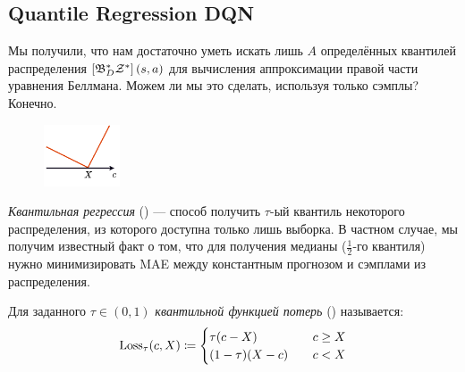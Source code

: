 \subsection{Quantile Regression DQN}\label{subsec:qrdqn}

Мы получили, что нам достаточно уметь искать лишь $A$ определённых квантилей распределения $\left[ \mathfrak{B}^*_D \mathcal{Z}^* \right](s, a)$ для вычисления аппроксимации правой части уравнения Беллмана. Можем ли мы это сделать, используя только сэмплы? Конечно. 

\begin{figure}
\vspace{-0.75cm}
\centering
\includegraphics[width=0.2\textwidth]{Images/quantileloss.png}
\vspace{-1.75cm}
\end{figure}
\emph{Квантильная регрессия} () --- способ получить $\tau$-ый квантиль некоторого распределения, из которого доступна только лишь выборка. В частном случае, мы получим известный факт о том, что для получения медианы ($\frac{1}{2}$-го квантиля) нужно минимизировать MAE между константным прогнозом и сэмплами из распределения.

\begin{definition}
Для заданного $\tau \in (0, 1)$ \emph{квантильной функцией потерь} () называется:
\begin{equation}\label{quantileloss}
\operatorname{Loss}_{\tau}(c, X) \coloneqq \begin{cases}
\tau (c - X) \quad &c \ge X \\
(1 - \tau) (X - c) \quad &c < X \\
\end{cases}
\end{equation}
\end{definition}

